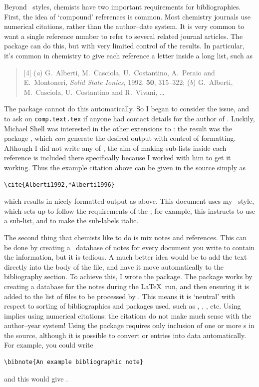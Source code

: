\begin{bibunit}
Beyond \BibTeX\ styles, chemists have two important
requirements for bibliographies.  First, the idea of
`compound' references is common.  Most chemistry journals use
numerical citations, rather than the author--date system.
It is very common to want a single reference number to refer to
several related journal articles.  The  package
\cite{Ohl2005} can do this, but with very limited control of
the results. In particular, it's common in chemistry to give
each reference a letter inside a long list, such as
\begin{quote}
  [4] (\emph{a}) G.~Alberti, M.~Casciola, U.~Costantino,
  A.~Peraio and E.~Montoneri, \emph{Solid State Ionics}, 1992,
  \textbf{50}, 315--322; (\emph{b}) G.~Alberti, M.~Casciola,
  U.~Costantino and R.~Vivani, \ldots
\end{quote}
The  package cannot do this automatically.  So I
began to consider the issue, and to ask on
\texttt{comp.text.tex} if anyone had contact details for the
author of . Luckily, Michael Shell was interested in
the other extensions to : the result was the
 package \cite{Shell2008}, which \emph{can}
generate the desired output with control of formatting.
Although I did not write any of , the aim of
making sub-lists inside each reference is included there
specifically because I worked with him to get it working. Thus
the example citation above can be given in the source simply as
\begin{verbatim}
\cite{Alberti1992,*Alberti1996}
\end{verbatim}
which results in nicely-formatted output
as above.
This document uses my
 \BibTeX\ style, which sets up 
to follow the requirements of the ; for example, this
instructs  to use a sub-list, and to make the
sub-labels italic.

The second thing that chemists like to do is mix notes and
references.  This can be done by creating a \BibTeX\ database
of notes for every document you write to contain the
information, but it is tedious.  A much better idea would be to
add the text directly into the body of the file, and have it
move automatically to the bibliography section.  To achieve
this, I wrote the  package.  The package works
by creating a database for the notes during the \LaTeX\ run,
and then ensuring it is added to the list of files to be
processed by \BibTeX. This means it is `neutral' with respect
to sorting of bibliographies and packages used, such as
 \cite{Arseneau2009},  \cite{Daly2009},
 \cite{Lehman2009}, etc.  Using 
implies using numerical citations: the citations do not make
much sense with the author--year system!  Using the package
requires only inclusion of one or more s in the
source, although it is possible to convert  or
 entries into  data automatically.  For
example, you could write
\begin{verbatim}
\bibnote{An example bibliographic note}
\end{verbatim}
and this would give .


\end{bibunit}
